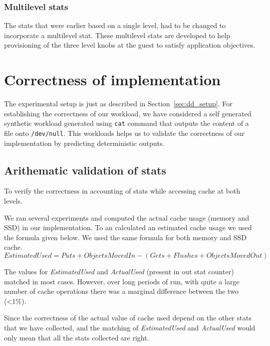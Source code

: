       \subsubsection{Multilevel stats}
	The stats that were earlier based on a single level, had to be changed to incorporate a multilevel stat. These 
	multilevel stats are developed to help provisioning of the three level knobs at the guest to satisfy application
	objectives.
  
  \section{Correctness of implementation}
  
      The experimental setup is just as described in Section~\ref{sec:dd_setup}.
      For establishing the correctness of our workload, we have considered a self 
      generated synthetic workload generated using \texttt{cat} command that 
      outputs the content of a file onto \texttt{/dev/null}. This workloads helps 
      us to validate the correctness of our implementation by predicting deterministic
      outputs.
  
    \subsection{Arithematic validation of stats}
    
	    To verify the correctness in accounting of stats while accessing cache at both levels.
	    
	We ran several experiments and computed the actual cache usage (memory and SSD) in our implementation. To an calculated 
	an estimated cache usage we used the formula given below. We used the same formula for both memory and SSD cache. 
	  \begin{equation}
	    EstimatedUsed = Puts + ObjectsMovedIn - (Gets + Flushes + ObjectsMovedOut)
	  \end{equation}
      
	The values for \textit{EstimatedUsed} and \textit{ActualUsed} (present in out stat counter) matched in most cases.
	However, over long periods of run, with quite a large number of cache operations there was a marginal difference
	between the two (\textless 1\%).
	
	Since the correctness of the actual value of cache used depend on the other stats that we have collected, and the 
	matching of \textit{EstimatedUsed} and \textit{ActualUsed} would only mean that all the stats collected are right.
    
